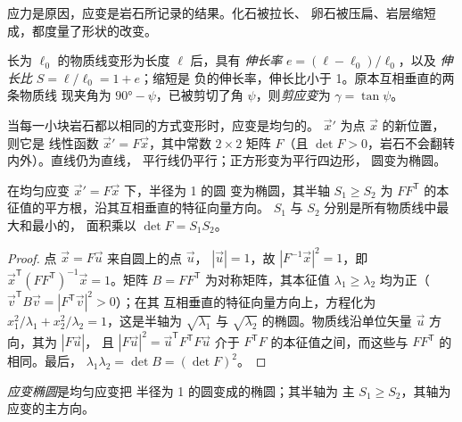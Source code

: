 应力是原因，应变是岩石所记录的结果。化石被拉长、
卵石被压扁、岩层缩短成，都度量了形状的改变。

\begin{definition}\label{def:b1:stress-strain-rheology:strain}
长为 $\ell_0$ 的物质线变形为长度 $\ell$ 后，具有
\emph{伸长率} $e = (\ell - \ell_0)/\ell_0$，以及
\emph{伸长比} $S = \ell/\ell_0 = 1 + e$；缩短是
负的伸长率，伸长比小于 1。原本互相垂直的两条物质线
现夹角为 $\ang{90} - \psi$，已被剪切了角
$\psi$，则\emph{剪应变}为
$\gamma = \tan\psi$。
\end{definition}

当每一小块岩石都以相同的方式变形时，应变是均匀的。
$\vec x'$ 为点 $\vec x$ 的新位置，则它是
线性函数 $\vec x' = F\vec x$，其中常数 $2\times2$ 矩阵 $F$（且
$\det F > 0$，岩石不会翻转内外）。直线仍为直线，
平行线仍平行；正方形变为平行四边形，
圆变为椭圆。

\begin{proposition}[应变椭圆]\label{prop:b1:stress-strain-rheology:ellipse}
在均匀应变 $\vec x' = F\vec x$ 下，半径为 1 的圆
变为椭圆，其半轴 $S_1 \ge S_2$ 为
$FF^{\mathsf T}$ 的本征值的平方根，沿其互相垂直的特征向量方向。
$S_1$ 与 $S_2$ 分别是所有物质线中最大和最小的，
面积乘以 $\det F = S_1S_2$。
\end{proposition}

\begin{proof}
点 $\vec x = F\vec u$ 来自圆上的点 $\vec u$，
$|\vec u| = 1$，故 $|F^{-1}\vec x|^2 = 1$，即
$\vec x^{\mathsf T}(FF^{\mathsf T})^{-1}\vec x = 1$。矩阵
$B = FF^{\mathsf T}$ 为对称矩阵，其本征值 $\lambda_1 \ge
\lambda_2$ 均为正（$\vec v^{\mathsf T}B\vec v = |F^{\mathsf T}\vec v|^2 > 0$）；在其
互相垂直的特征向量方向上，方程化为
$x_1^2/\lambda_1 + x_2^2/\lambda_2 = 1$，这是半轴为
$\sqrt{\lambda_1}$ 与 $\sqrt{\lambda_2}$ 的椭圆。物质线沿单位矢量
$\vec u$ 方向，其为 $|F\vec u|$，
且 $|F\vec u|^2 = \vec u^{\mathsf T}F^{\mathsf T}F\vec u$ 介于
$F^{\mathsf T}F$ 的本征值之间，而这些与 $FF^{\mathsf T}$ 的相同。最后，
$\lambda_1\lambda_2 = \det B = (\det F)^2$。
\end{proof}

\begin{definition}[应变椭圆]\label{def:b1:stress-strain-rheology:strain-ellipse}
\emph{应变椭圆}是均匀应变把
半径为 1 的圆变成的椭圆；其半轴为
主 $S_1 \ge S_2$，其轴为
应变的主方向。
\end{definition}

